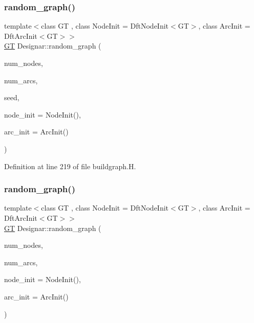 \subsubsection{\texorpdfstring{random\+\_\+graph()}{random\_graph()}\hspace{0.1cm}{\footnotesize\ttfamily [2/3]}}
{\footnotesize\ttfamily template$<$class GT , class Node\+Init  = Dft\+Node\+Init$<$\+G\+T$>$, class Arc\+Init  = Dft\+Arc\+Init$<$\+G\+T$>$$>$ \\
\hyperlink{demo-buildgraph_8_c_a3001c40d2c31ca87ed96cd7d1334a55e}{GT} Designar\+::random\+\_\+graph (\begin{DoxyParamCaption}\item[{\hyperlink{namespace_designar_aa72662848b9f4815e7bf31a7cf3e33d1}{nat\+\_\+t}}]{num\+\_\+nodes,  }\item[{\hyperlink{namespace_designar_aa72662848b9f4815e7bf31a7cf3e33d1}{nat\+\_\+t}}]{num\+\_\+arcs,  }\item[{\hyperlink{namespace_designar_ad621b5646d45288c5d6a1e1dfe7531a8}{rng\+\_\+seed\+\_\+t}}]{seed,  }\item[{Node\+Init \&\&}]{node\+\_\+init = {\ttfamily NodeInit()},  }\item[{Arc\+Init \&\&}]{arc\+\_\+init = {\ttfamily ArcInit()} }\end{DoxyParamCaption})}



Definition at line 219 of file buildgraph.\+H.

\mbox{\label{namespace_designar_ad7f5900a4d30c7e30bd22ca58ce5aa0f}} 
\subsubsection{\texorpdfstring{random\+\_\+graph()}{random\_graph()}\hspace{0.1cm}{\footnotesize\ttfamily [3/3]}}
{\footnotesize\ttfamily template$<$class GT , class Node\+Init  = Dft\+Node\+Init$<$\+G\+T$>$, class Arc\+Init  = Dft\+Arc\+Init$<$\+G\+T$>$$>$ \\
\hyperlink{demo-buildgraph_8_c_a3001c40d2c31ca87ed96cd7d1334a55e}{GT} Designar\+::random\+\_\+graph (\begin{DoxyParamCaption}\item[{\hyperlink{namespace_designar_aa72662848b9f4815e7bf31a7cf3e33d1}{nat\+\_\+t}}]{num\+\_\+nodes,  }\item[{\hyperlink{namespace_designar_aa72662848b9f4815e7bf31a7cf3e33d1}{nat\+\_\+t}}]{num\+\_\+arcs,  }\item[{Node\+Init \&\&}]{node\+\_\+init = {\ttfamily NodeInit()},  }\item[{Arc\+Init \&\&}]{arc\+\_\+init = {\ttfamily ArcInit()} }\end{DoxyParamCaption})}



